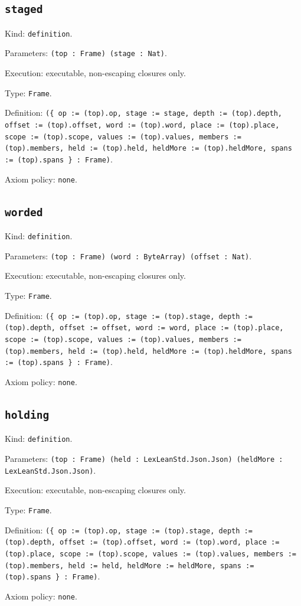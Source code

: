 \documentclass[11pt]{article}
\begin{document}
\subsection*{\texttt{staged}}
\noindent Kind: \texttt{definition}.\par
\noindent Parameters: \texttt{(top : Frame) (stage : Nat)}.\par
\noindent Execution: executable, non-escaping closures only.\par
\noindent Type: \texttt{Frame}.\par
\noindent Definition: \texttt{(\{ op := (top).op, stage := stage, depth := (top).depth, offset := (top).offset, word := (top).word, place := (top).place, scope := (top).scope, values := (top).values, members := (top).members, held := (top).held, heldMore := (top).heldMore, spans := (top).spans \} : Frame)}.\par
\noindent Axiom policy: \texttt{none}.\par
\subsection*{\texttt{worded}}
\noindent Kind: \texttt{definition}.\par
\noindent Parameters: \texttt{(top : Frame) (word : ByteArray) (offset : Nat)}.\par
\noindent Execution: executable, non-escaping closures only.\par
\noindent Type: \texttt{Frame}.\par
\noindent Definition: \texttt{(\{ op := (top).op, stage := (top).stage, depth := (top).depth, offset := offset, word := word, place := (top).place, scope := (top).scope, values := (top).values, members := (top).members, held := (top).held, heldMore := (top).heldMore, spans := (top).spans \} : Frame)}.\par
\noindent Axiom policy: \texttt{none}.\par
\subsection*{\texttt{holding}}
\noindent Kind: \texttt{definition}.\par
\noindent Parameters: \texttt{(top : Frame) (held : LexLeanStd.Json.Json) (heldMore : LexLeanStd.Json.Json)}.\par
\noindent Execution: executable, non-escaping closures only.\par
\noindent Type: \texttt{Frame}.\par
\noindent Definition: \texttt{(\{ op := (top).op, stage := (top).stage, depth := (top).depth, offset := (top).offset, word := (top).word, place := (top).place, scope := (top).scope, values := (top).values, members := (top).members, held := held, heldMore := heldMore, spans := (top).spans \} : Frame)}.\par
\noindent Axiom policy: \texttt{none}.\par
\end{document}
